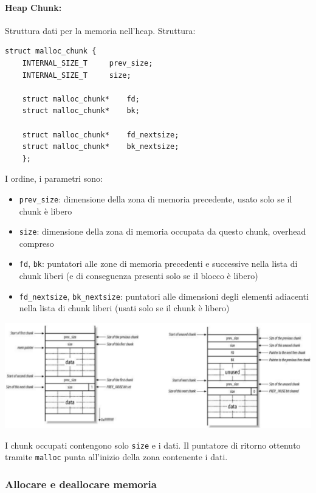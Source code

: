 \paragraph{Heap Chunk:} Struttura dati per la memoria nell'heap. Struttura:
\begin{verbatim}
struct malloc_chunk {
	INTERNAL_SIZE_T 	prev_size; 
	INTERNAL_SIZE_T 	size; 
	
	struct malloc_chunk* 	fd;
	struct malloc_chunk* 	bk;
	
	struct malloc_chunk* 	fd_nextsize;
	struct malloc_chunk* 	bk_nextsize;
	};
\end{verbatim}
I ordine, i parametri sono:
\begin{itemize}
	\item \texttt{prev\_size}: dimensione della zona di memoria precedente, usato solo se il chunk è libero
	\item \texttt{size}: dimensione della zona di memoria occupata da questo chunk, overhead compreso
	\item \texttt{fd}, \texttt{bk}: puntatori alle zone di memoria precedenti e successive nella lista di chunk liberi (e di conseguenza presenti solo se il blocco è libero)
	\item \texttt{fd\_nextsize}, \texttt{bk\_nextsize}: puntatori alle dimensioni degli elementi adiacenti nella lista di chunk liberi (usati solo se il chunk è libero)
\end{itemize}
\begin{center}
	\includegraphics[width=\linewidth]{img/sme/heapchunk}
\end{center}
I chunk occupati contengono solo \texttt{size} e i dati. Il puntatore di ritorno ottenuto tramite \texttt{malloc} punta all'inizio della zona contenente i dati. \\

\newpage

\subsubsection{Allocare e deallocare memoria}

